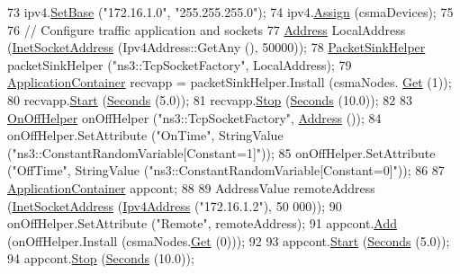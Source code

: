 \begin{DoxyCode}
73   ipv4.\hyperlink{classns3_1_1Ipv4AddressHelper_acf7b16dd25bac67e00f5e25f90a9a035}{SetBase} (\textcolor{stringliteral}{"172.16.1.0"}, \textcolor{stringliteral}{"255.255.255.0"});
74   ipv4.\hyperlink{classns3_1_1Ipv4AddressHelper_af8e7f4a1a7e74c00014a1eac445a27af}{Assign} (csmaDevices);
75 
76   \textcolor{comment}{// Configure traffic application and sockets}
77   \hyperlink{classns3_1_1Address}{Address} LocalAddress (\hyperlink{classns3_1_1InetSocketAddress}{InetSocketAddress} (Ipv4Address::GetAny (), 50000));
78   \hyperlink{classns3_1_1PacketSinkHelper}{PacketSinkHelper} packetSinkHelper (\textcolor{stringliteral}{"ns3::TcpSocketFactory"}, LocalAddress);
79   \hyperlink{classns3_1_1ApplicationContainer}{ApplicationContainer} recvapp = packetSinkHelper.Install (csmaNodes.
      \hyperlink{classns3_1_1NodeContainer_a9ed96e2ecc22e0f5a3d4842eb9bf90bf}{Get} (1));
80   recvapp.\hyperlink{classns3_1_1ApplicationContainer_a8eff87926507020bbe3e1390358a54a7}{Start} (\hyperlink{group__timecivil_ga33c34b816f8ff6628e33d5c8e9713b9e}{Seconds} (5.0));
81   recvapp.\hyperlink{classns3_1_1ApplicationContainer_adfc52f9aa4020c8714679b00bbb9ddb3}{Stop} (\hyperlink{group__timecivil_ga33c34b816f8ff6628e33d5c8e9713b9e}{Seconds} (10.0));
82 
83   \hyperlink{classns3_1_1OnOffHelper}{OnOffHelper} onOffHelper (\textcolor{stringliteral}{"ns3::TcpSocketFactory"}, \hyperlink{classns3_1_1Address}{Address} ());
84   onOffHelper.SetAttribute (\textcolor{stringliteral}{"OnTime"}, StringValue (\textcolor{stringliteral}{"ns3::ConstantRandomVariable[Constant=1]"}));
85   onOffHelper.SetAttribute (\textcolor{stringliteral}{"OffTime"}, StringValue (\textcolor{stringliteral}{"ns3::ConstantRandomVariable[Constant=0]"}));
86 
87   \hyperlink{classns3_1_1ApplicationContainer}{ApplicationContainer} appcont;
88 
89   AddressValue remoteAddress (\hyperlink{classns3_1_1InetSocketAddress}{InetSocketAddress} (\hyperlink{classns3_1_1Ipv4Address}{Ipv4Address} (\textcolor{stringliteral}{"172.16.1.2"}), 50
      000));
90   onOffHelper.SetAttribute (\textcolor{stringliteral}{"Remote"}, remoteAddress);
91   appcont.\hyperlink{classns3_1_1ApplicationContainer_ad09ab1a1ad5849d518d5f4c262e38152}{Add} (onOffHelper.Install (csmaNodes.\hyperlink{classns3_1_1NodeContainer_a9ed96e2ecc22e0f5a3d4842eb9bf90bf}{Get} (0)));
92 
93   appcont.\hyperlink{classns3_1_1ApplicationContainer_a8eff87926507020bbe3e1390358a54a7}{Start} (\hyperlink{group__timecivil_ga33c34b816f8ff6628e33d5c8e9713b9e}{Seconds} (5.0));
94   appcont.\hyperlink{classns3_1_1ApplicationContainer_adfc52f9aa4020c8714679b00bbb9ddb3}{Stop} (\hyperlink{group__timecivil_ga33c34b816f8ff6628e33d5c8e9713b9e}{Seconds} (10.0));

\end{DoxyCode}

